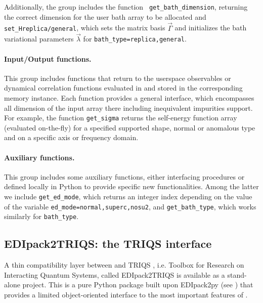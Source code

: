 \documentclass[edipack_sp.tex]{subfiles}
\begin{document}
Additionally, the group includes the function {\tt
  get\_bath\_dimension}, returning the correct
dimension for the user bath array to be allocated and {\tt
  set\_H{replica/general}}, which sets the matrix basis
$\vec{\Gamma}$ and initializes the bath variational parameters
$\vec{\lambda}$ for {\tt bath\_type=replica,general}. 




  
\paragraph{{\bf Input/Output functions}.}
This group includes functions that return to the userspace
observables or dynamical correlation functions evaluated in \NAME and
stored in the corresponding memory instance. Each function
provides a general interface, which encompasses all dimension of the
input array there including inequivalent impurities support.
For example, the function {\tt get\_sigma} returns the self-energy
function array (evaluated on-the-fly) for a specified supported shape,
normal or anomalous type and on a specific axis or frequency domain. 
    

\paragraph{{\bf Auxiliary functions}.}
This group includes some auxiliary functions, either interfacing \NAME
procedures or defined locally in Python to provide specific new
functionalities. Among the latter we include {\tt get\_ed\_mode}, which returns an integer index depending on the value of the variable {\tt ed\_mode=normal,superc,nosu2},
and {\tt get\_bath\_type}, which works similarly for {\tt bath\_type}.









\subsection{EDIpack2TRIQS: the TRIQS interface}\label{sSecInteropTRIQS}
A thin compatibility layer between \NAME and TRIQS \cite{Parcollet2015CPC}, i.e. Toolbox for Research on
Interacting Quantum Systems,  called EDIpack2TRIQS is available as a stand-alone project. This is a pure Python package
built upon EDIpack2py (see ) that provides a
limited object-oriented interface to the most important features of \NAME.
\end{document}
